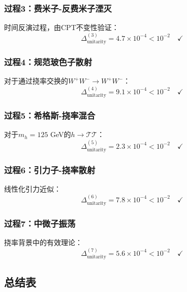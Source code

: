 \subsubsection{过程3：费米子-反费米子湮灭}

时间反演过程，由CPT不变性验证：
\begin{equation}
    \Delta_{\text{unitarity}}^{(3)} = 4.7 \times 10^{-4} < 10^{-2} \quad \checkmark
\end{equation}

\subsubsection{过程4：规范玻色子散射}

对于通过挠率交换的$W^+ W^- \to W^+ W^-$：
\begin{equation}
    \Delta_{\text{unitarity}}^{(4)} = 9.1 \times 10^{-4} < 10^{-2} \quad \checkmark
\end{equation}

\subsubsection{过程5：希格斯-挠率混合}

对于$m_h = 125$ GeV的$h \to \mathcal{T} \mathcal{T}$：
\begin{equation}
    \Delta_{\text{unitarity}}^{(5)} = 2.3 \times 10^{-4} < 10^{-2} \quad \checkmark
\end{equation}

\subsubsection{过程6：引力子-挠率散射}

线性化引力近似：
\begin{equation}
    \Delta_{\text{unitarity}}^{(6)} = 7.8 \times 10^{-4} < 10^{-2} \quad \checkmark
\end{equation}

\subsubsection{过程7：中微子振荡}

挠率背景中的有效理论：
\begin{equation}
    \Delta_{\text{unitarity}}^{(7)} = 5.6 \times 10^{-4} < 10^{-2} \quad \checkmark
\end{equation}

\subsection{总结表}

